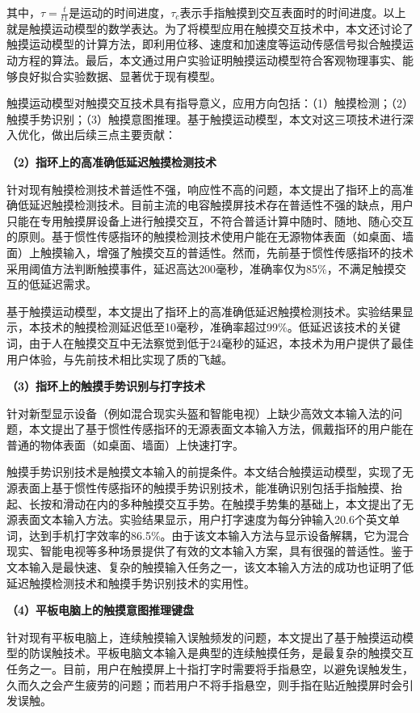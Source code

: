 其中，$\tau=\frac{t}{t1}$是运动的时间进度，$\tau_c$表示手指触摸到交互表面时的时间进度。以上就是触摸运动模型的数学表达。为了将模型应用在触摸交互技术中，本文还讨论了触摸运动模型的计算方法，即利用位移、速度和加速度等运动传感信号拟合触摸运动方程的算法。最后，本文通过用户实验证明触摸运动模型符合客观物理事实、能够良好拟合实验数据、显著优于现有模型。

触摸运动模型对触摸交互技术具有指导意义，应用方向包括：（1）触摸检测；（2）触摸手势识别；（3）触摸意图推理。基于触摸运动模型，本文对这三项技术进行深入优化，做出后续三点主要贡献：

\textbf{（2）指环上的高准确低延迟触摸检测技术}

针对现有触摸检测技术普适性不强，响应性不高的问题，本文提出了指环上的高准确低延迟触摸检测技术。目前主流的电容触摸屏技术存在普适性不强的缺点，用户只能在专用触摸屏设备上进行触摸交互，不符合普适计算中随时、随地、随心交互的原则。基于惯性传感指环的触摸检测技术使用户能在无源物体表面（如桌面、墙面）上触摸输入\cite{lam2002mids, oh2017anywheretouch}，增强了触摸交互的普适性。然而，先前基于惯性传感指环的技术采用阈值方法判断触摸事件，延迟高达200毫秒，准确率仅为85\%，不满足触摸交互的低延迟需求。

基于触摸运动模型，本文提出了指环上的高准确低延迟触摸检测技术。实验结果显示，本技术的触摸检测延迟低至10毫秒，准确率超过99\%。低延迟该技术的关键词，由于人在触摸交互中无法察觉到低于24毫秒的延迟，本技术为用户提供了最佳用户体验，与先前技术相比实现了质的飞越。

\textbf{（3）指环上的触摸手势识别与打字技术}

针对新型显示设备（例如混合现实头盔和智能电视）上缺少高效文本输入法的问题，本文提出了基于惯性传感指环的无源表面文本输入方法，佩戴指环的用户能在普通的物体表面（如桌面、墙面）上快速打字。

触摸手势识别技术是触摸文本输入的前提条件。本文结合触摸运动模型，实现了无源表面上基于惯性传感指环的触摸手势识别技术，能准确识别包括手指触摸、抬起、长按和滑动在内的多种触摸交互手势。在触摸手势集的基础上，本文提出了无源表面文本输入方法。实验结果显示，用户打字速度为每分钟输入20.6个英文单词，达到手机打字效率的86.5\%。由于该文本输入方法与显示设备解耦，它为混合现实、智能电视等多种场景提供了有效的文本输入方案，具有很强的普适性。鉴于文本输入是最快速、复杂的触摸输入任务之一，该文本输入方法的成功也证明了低延迟触摸检测技术和触摸手势识别技术的实用性。

\textbf{（4）平板电脑上的触摸意图推理键盘}

针对现有平板电脑上，连续触摸输入误触频发的问题，本文提出了基于触摸运动模型的防误触技术。平板电脑文本输入是典型的连续触摸任务，是最复杂的触摸交互任务之一。目前，用户在触摸屏上十指打字时需要将手指悬空，以避免误触发生，久而久之会产生疲劳的问题；而若用户不将手指悬空，则手指在贴近触摸屏时会引发误触。


